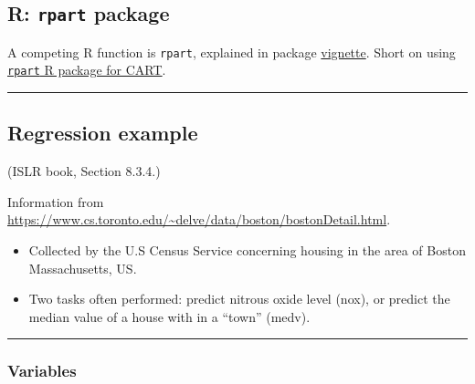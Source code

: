 \documentclass[
  letterpaper,
  DIV=11,
  numbers=noendperiod]{scrartcl}
\providecommand{\tightlist}{%
  \setlength{\itemsep}{0pt}\setlength{\parskip}{0pt}}\usepackage{longtable,booktabs,array}
\begin{document}
\hypertarget{r-rpart-package}{%
\subsection{\texorpdfstring{R: \texttt{rpart}
package}{R: rpart package}}\label{r-rpart-package}}

A competing R function is \texttt{rpart}, explained in package
\href{https://cran.r-project.org/web/packages/rpart/vignettes/longintro.pdf}{vignette}.
Short on using
\href{https://www.statmethods.net/advstats/cart.html}{\texttt{rpart} R
package for CART}.

\begin{center}\rule{0.5\linewidth}{0.5pt}\end{center}

\hypertarget{regression-example}{%
\subsection{Regression example}\label{regression-example}}

(ISLR book, Section 8.3.4.)

Information from
\url{https://www.cs.toronto.edu/~delve/data/boston/bostonDetail.html}.

\begin{itemize}
\tightlist
\item
  Collected by the U.S Census Service concerning housing in the area of
  Boston Massachusetts, US.
\item
  Two tasks often performed: predict nitrous oxide level (nox), or
  predict the median value of a house with in a ``town'' (medv).
\end{itemize}

\begin{center}\rule{0.5\linewidth}{0.5pt}\end{center}

\hypertarget{variables}{%
\subsubsection{Variables}\label{variables}}
\end{document}
